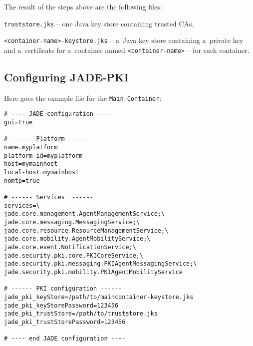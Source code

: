 \documentclass[a4paper,11pt]{article}
\newenvironment{itemize*}
{\begin{itemize}
  \setlength{\itemsep}{0pt}
  \setlength{\parskip}{0pt}}
{\end{itemize}}
\begin{document}
The result of the steps above are the following files:

\begin{itemize*}

  \item \texttt{truststore.jks} -- one Java key store containing trusted CAs,

  \item \texttt{<container-name>-keystore.jks} -- a~Java key store containing
    a~private key and a~certificate for a~container named
    \texttt{<container-name>} -- for each container.

\end{itemize*}

\subsection{Configuring JADE-PKI}

Here goes the example file for the \texttt{Main-Container}:

\begin{verbatim}
# ---- JADE configuration ----
gui=true

# ------ Platform ------
name=myplatform
platform-id=myplatform
host=mymainhost
local-host=mymainhost
nomtp=true

# ------ Services  ------
services=\
jade.core.management.AgentManagementService;\
jade.core.messaging.MessagingService;\
jade.core.resource.ResourceManagementService;\
jade.core.mobility.AgentMobilityService;\
jade.core.event.NotificationService;\
jade.security.pki.core.PKICoreService;\
jade.security.pki.messaging.PKIAgentMessagingService;\
jade.security.pki.mobility.PKIAgentMobilityService

# ------ PKI configuration ------
jade_pki_keyStore=/path/to/maincontainer-keystore.jks
jade_pki_keyStorePassword=123456
jade_pki_trustStore=/path/to/truststore.jks
jade_pki_trustStorePassword=123456 

# ---- end JADE configuration ----
\end{verbatim}
\end{document}
